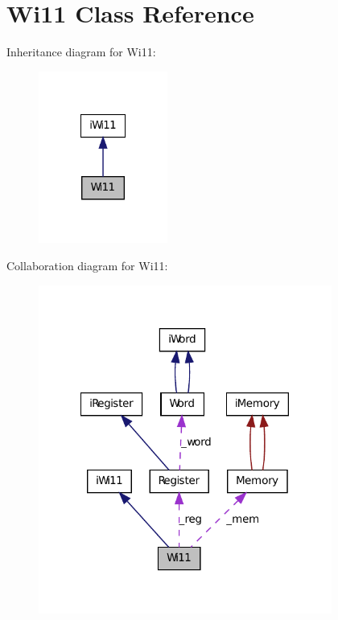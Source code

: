 \hypertarget{classWi11}{
\section{Wi11 Class Reference}
\label{classWi11}
}


Inheritance diagram for Wi11:
\nopagebreak
\begin{figure}[H]
\begin{center}
\leavevmode
\includegraphics[width=120pt]{classWi11__inherit__graph}
\end{center}
\end{figure}


Collaboration diagram for Wi11:
\nopagebreak
\begin{figure}[H]
\begin{center}
\leavevmode
\includegraphics[width=273pt]{classWi11__coll__graph}
\end{center}
\end{figure}

